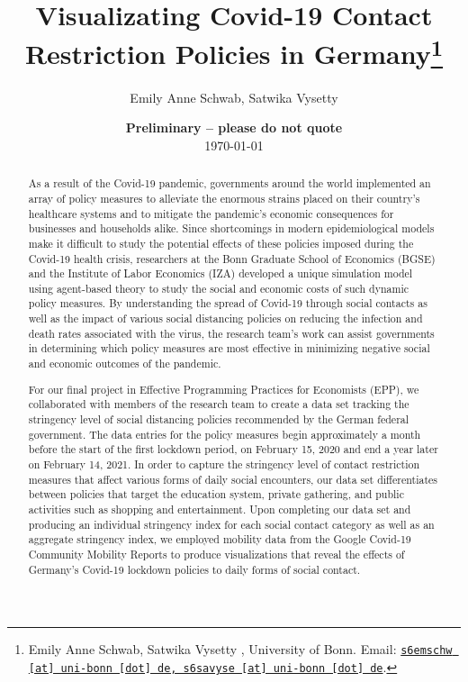 \documentclass[11pt, a4paper, leqno]{article}
\begin{document}
\title{Visualizating Covid-19 Contact Restriction Policies in Germany\thanks{Emily Anne Schwab, Satwika Vysetty , University of Bonn. Email: \href{mailto:s6emschw@uni-bonn.de, s6savyse@uni-bonn.de}{\nolinkurl{s6emschw [at] uni-bonn [dot] de, s6savyse [at] uni-bonn [dot] de}}.}}

\author{Emily Anne Schwab, Satwika Vysetty }

\date{
    {\bf Preliminary -- please do not quote}
    \\[1ex]
    \today
}

\maketitle


\begin{abstract}
As a result of the Covid-19 pandemic, governments around the world implemented an array of policy measures to alleviate the enormous strains placed on their country’s healthcare systems and to mitigate the pandemic’s economic consequences for businesses and households alike. Since shortcomings in modern epidemiological models make it difficult to study the potential effects of these policies imposed during the Covid-19 health crisis, researchers at the Bonn Graduate School of Economics (BGSE) and the Institute of Labor Economics (IZA) developed a unique simulation model using agent-based theory to study the social and economic costs of such dynamic policy measures. By understanding the spread of Covid-19 through social contacts as well as the impact of various social distancing policies on reducing the infection and death rates associated with the virus, the research team’s work can assist governments in determining which policy measures are most effective in minimizing negative social and economic outcomes of the pandemic.

For our final project in Effective Programming Practices for Economists (EPP), we collaborated with members of the research team to create a data set tracking the stringency level of social distancing policies recommended by the German federal government. The data entries for the policy measures begin approximately a month before the start of the first lockdown period, on February 15, 2020 and end a year later on February 14, 2021. In order to capture the stringency level of contact restriction measures that affect various forms of daily social encounters, our data set differentiates between policies that target the education system, private gathering, and public activities such as shopping and entertainment. Upon completing our data set and producing an individual stringency index for each social contact category as well as an aggregate stringency index, we employed mobility data from the Google Covid-19 Community Mobility Reports to produce visualizations that reveal the effects of Germany’s Covid-19 lockdown policies to daily forms of social contact.
\end{abstract}
\clearpage
\end{document}
